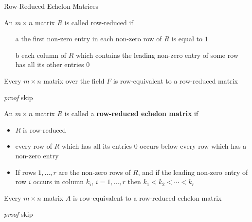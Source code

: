 \documentclass[8pt]{beamer}
\newcommand{\tb}[1]{\textbf{#1}}
\newcommand{\ti}[1]{\textit{#1}}
\begin{document}
\begin{frame}{Row-Reduced Echelon Matrices}
  \begin{definition}
    An $m \times n$ matrix $R$ is called row-reduced if  
    \begin{enumerate}
      \item[a] the first non-zero entry in each non-zero row of $R$ is equal to $1$
      \item[b] each column of $R$ which contains the leading non-zero entry of some row has all its other entries $0$
    \end{enumerate}
  \end{definition}

  \begin{theorem}
    Every $m \times n$ matrix over the field $F$ is row-equivalent to a row-reduced matrix
  \end{theorem}
  \ti{proof} skip

  \begin{definition}
    An $m \times n$ matrix $R$ is called a \tb{row-reduced echelon matrix} if
    \begin{itemize}
      \item $R$ is row-reduced
      \item every row of $R$ which has all its entries $0$ occurs below every row which has a non-zero entry
      \item If rows $1, \dots, r$ are the non-zero rows of $R$, and if the leading non-zero entry of row $i$ occurs in column $k_i$, $i=1, \dots, r$ then $k_1< k_2< \cdots < k_r$
    \end{itemize}
  \end{definition}

  \begin{theorem}
    Every $m \times n$ matrix $A$ is row-equivalent to a row-reduced echelon matrix
  \end{theorem}
  \ti{proof} skip
\end{frame}
\end{document}

